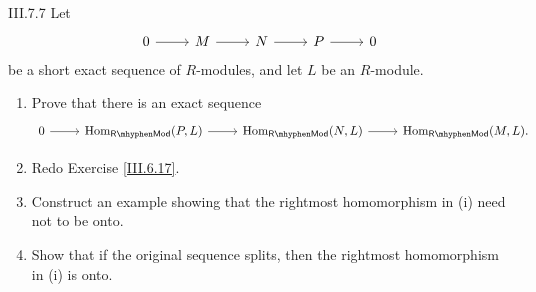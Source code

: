 \begin{problem}{III.7.7}
Let
\[
\begin{tikzcd}
0 \arrow[r] &M \arrow[r] &N \arrow[r] &P \arrow[r] &0
\end{tikzcd}
\]
be a short exact sequence of $R$-modules, and let $L$ be an $R$-module.
\begin{enumerate}[label=(\roman*)]
    \setlength\itemsep{0pt}
    \item Prove that there is an exact sequence
    \[
    \begin{tikzcd}
    0 \arrow[r] &\Hom_\mathsf{R\mhyphen Mod}(P,L) \arrow[r] &\Hom_\mathsf{R\mhyphen Mod}(N,L) \arrow[r] &\Hom_\mathsf{R\mhyphen Mod}(M,L).
    \end{tikzcd}
    \]
    \item Redo Exercise \ref{III.6.17}.
    \item Construct an example showing that the rightmost homomorphism in (i) need not to be onto.
    \item Show that if the original sequence splits, then the rightmost homomorphism in (i) is onto.
\end{enumerate}
\end{problem}

